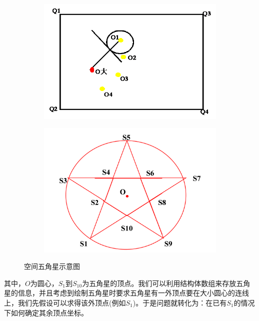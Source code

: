             \begin{figure}[H]
            \centering
            \begin{subfigure}[b]{0.4\textwidth}
                \includegraphics[width=\textwidth]{images/14.jpg}
                \caption{}
            \end{subfigure}
            \begin{subfigure}[b]{0.4\textwidth}
                \includegraphics[width=\textwidth]{images/15.jpg}
                \caption{}
            \end{subfigure}
            \caption{空间五角星示意图}
            \label{空间五角星示意图}
            \end{figure}
            其中，$O$为圆心，$S_{1}$到$S_{10}$为五角星的顶点。我们可以利用结构体数组来存放五角星的信息，并且考虑到绘制五角星时要求五角星有一外顶点要在大小圆心的连线上，我们先假设可以求得该外顶点(例如$S_{1}$)。于是问题就转化为：在已有$S_{1}$的情况下如何确定其余顶点坐标。
